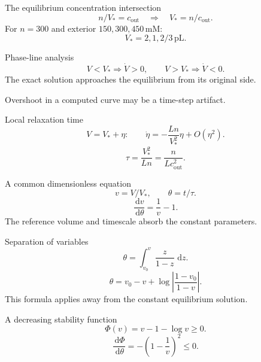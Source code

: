\documentclass[aspectratio=169,11pt]{beamer}
\providecommand{\dd}{\,\mathrm{d}}\providecommand{\R}{\mathbb{R}}
\newcommand{\notestarget}{notes.pdf}\newcommand{\noteslabel}{Notes}
\begin{document}
\renewcommand{\notestarget}{notes.pdf\#note-equilibrium-direction-of-motion-and-stability}
\begin{frame}[t,fragile,label=slide-the-equilibrium-concentration-intersection]{The equilibrium concentration intersection}
\[n/V_*=c_{\mathrm{out}}\quad\Longrightarrow\quad V_*=n/c_{\mathrm{out}}.\]\pause{} For $n=300$ and exterior $150,300,450\,\mathrm{mM}$:\[V_*=2,1,2/3\,\mathrm{pL}.\]
\end{frame}
\renewcommand{\notestarget}{notes.pdf\#note-equilibrium-direction-of-motion-and-stability}
\begin{frame}[t,fragile,label=slide-phase-line-analysis]{Phase-line analysis}
\[V<V_*\Rightarrow\dot V>0,\qquad V>V_*\Rightarrow\dot V<0.\]\pause{} The exact solution approaches the equilibrium from its original side.\par\medskip Overshoot in a computed curve may be a time-step artifact.
\end{frame}
\renewcommand{\notestarget}{notes.pdf\#note-equilibrium-direction-of-motion-and-stability}
\begin{frame}[t,fragile,label=slide-local-relaxation-time]{Local relaxation time}
\[V=V_*+\eta:\qquad \dot\eta=-\frac{Ln}{V_*^2}\eta+O(\eta^2).\]\pause{}\[\tau=\frac{V_*^2}{Ln}=\frac n{Lc_{\mathrm{out}}^2}.\]
\end{frame}
\renewcommand{\notestarget}{notes.pdf\#note-dimensionless-dynamics-and-an-implicit-exact-solution}
\begin{frame}[t,fragile,label=slide-a-common-dimensionless-equation]{A common dimensionless equation}
\[v=V/V_*,\qquad\theta=t/\tau.\]\pause{}\[\frac{\dd v}{\dd\theta}=\frac1v-1.\] The reference volume and timescale absorb the constant parameters.
\end{frame}
\renewcommand{\notestarget}{notes.pdf\#note-dimensionless-dynamics-and-an-implicit-exact-solution}
\begin{frame}[t,fragile,label=slide-separation-of-variables]{Separation of variables}
\[\theta=\int_{v_0}^{v}\frac z{1-z}\,\dd z.\]\pause{}\[\theta=v_0-v+\log\left|\frac{1-v_0}{1-v}\right|.\] This formula applies away from the constant equilibrium solution.
\end{frame}
\renewcommand{\notestarget}{notes.pdf\#note-dimensionless-dynamics-and-an-implicit-exact-solution}
\begin{frame}[t,fragile,label=slide-a-decreasing-stability-function]{A decreasing stability function}
\[\Phi(v)=v-1-\log v\geq0.\]\pause{}\[\frac{\dd\Phi}{\dd\theta}=-\left(1-\frac1v\right)^2\leq0.\]
\end{frame}
\end{document}
